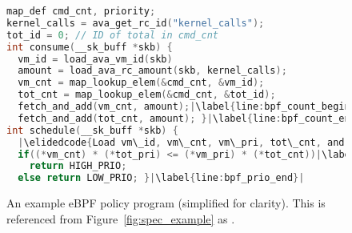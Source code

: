 {\begin{figure}
	\centering
\begin{lstlisting}[language=C,columns=flexible,mathescape,belowskip=0em,aboveskip=0em,basicstyle={\scriptsize\ttfamily},escapechar=|]
map_def cmd_cnt, priority;
kernel_calls = ava_get_rc_id("kernel_calls");
tot_id = 0; // ID of total in cmd_cnt
int consume(__sk_buff *skb) {
  vm_id = load_ava_vm_id(skb)
  amount = load_ava_rc_amount(skb, kernel_calls);
  vm_cnt = map_lookup_elem(&cmd_cnt, &vm_id);
  tot_cnt = map_lookup_elem(&cmd_cnt, &tot_id);
  fetch_and_add(vm_cnt, amount);|\label{line:bpf_count_begin}|
  fetch_and_add(tot_cnt, amount); }|\label{line:bpf_count_end}|
int schedule(__sk_buff *skb) {
  |\elidedcode{Load vm\_id, vm\_cnt, vm\_pri, tot\_cnt, and tot\_pri}|
  if((*vm_cnt) * (*tot_pri) <= (*vm_pri) * (*tot_cnt))|\label{line:bpf_prio_begin}|
    return HIGH_PRIO;
  else return LOW_PRIO; }|\label{line:bpf_prio_end}|
\end{lstlisting}
\vspace*{-5pt}\caption{An example eBPF policy program (simplified for clarity). This is referenced from Figure~\ref{fig:spec_example} as .
}
	\label{fig:scheduler_example}
\end{figure}

}
